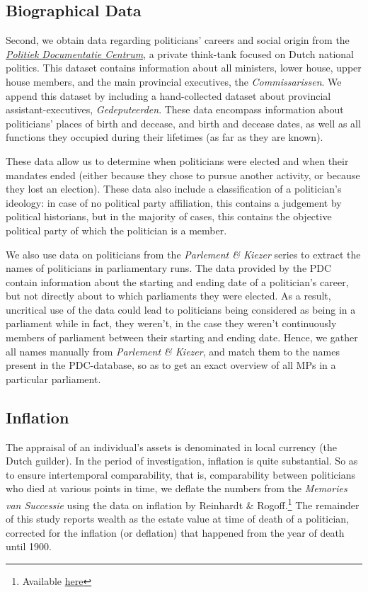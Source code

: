 \subsection{Biographical Data}
    Second, we obtain data regarding politicians' careers and social origin from the \href{www.pdc.nl}{\textit{Politiek Documentatie Centrum}}, a private think-tank focused on Dutch national politics. This dataset contains information about all ministers, lower house, upper house members, and the main provincial executives, the \textit{Commissarissen}. We append this dataset by including a hand-collected dataset about provincial assistant-executives, \textit{Gedeputeerden}. These data encompass information about politicians' places of birth and decease, and birth and decease dates, as well as all functions they occupied during their lifetimes (as far as they are known). 

    These data allow us to determine when politicians were elected and when their mandates ended (either because they chose to pursue another activity, or because they lost an election). These data also include a classification of a politician's ideology: in case of no political party affiliation, this contains a judgement by political historians, but in the majority of cases, this contains the objective political party of which the politician is a member. 

    We also use data on politicians from the \textit{Parlement \& Kiezer} series to extract the names of politicians in parliamentary runs. The data provided by the PDC contain information about the starting and ending date of a politician's career, but not directly about to which parliaments they were elected. As a result, uncritical use of the data could lead to politicians being considered as being in a parliament while in fact, they weren't, in the case they weren't continuously members of parliament between their starting and ending date. Hence, we gather all names manually from \textit{Parlement \& Kiezer}, and match them to the names present in the PDC-database, so as to get an exact overview of all MPs in a particular parliament. 

\subsection{Inflation}
    The appraisal of an individual's assets is denominated in local currency (the Dutch guilder). In the period of investigation, inflation is quite substantial. So as to ensure intertemporal comparability, that is, comparability between politicians who died at various points in time, we deflate the numbers from the \textit{Memories van Successie} using the data on inflation by Reinhardt \& Rogoff.\footnote{Available \href{https://carmenreinhart.com/2020/02/netherlands/}{here}} The remainder of this study reports wealth as the estate value at time of death of a politician, corrected for the inflation (or deflation) that happened from the year of death until 1900. 

